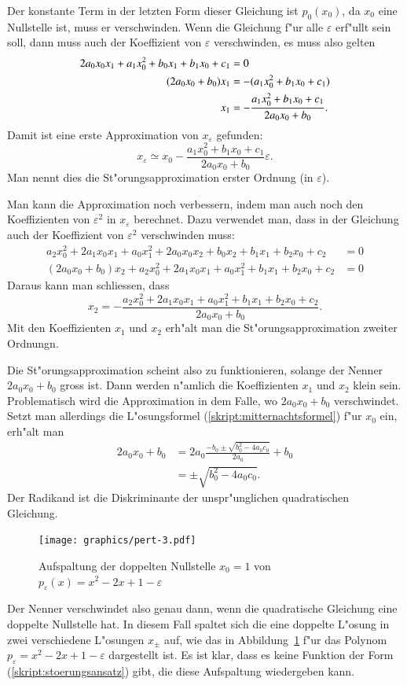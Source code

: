 Der konstante Term in der letzten Form dieser Gleichung ist $p_0(x_0)$, 
da $x_0$ eine Nullstelle ist, muss er verschwinden. Wenn die Gleichung
f"ur alle $\varepsilon$ erf"ullt sein soll, dann muss auch der
Koeffizient von $\varepsilon$ verschwinden, es muss also gelten
\begin{align}
2a_0x_0x_1+a_1x_0^2+b_0x_1+b_1x_0+c_1&= 0
\label{skript:stoerung-1ordnung}
\\
(2a_0x_0+b_0)x_1&=-(a_1x_0^2+b_1x_0+c_1)\\
x_1&=-
\frac{a_1x_0^2+b_1x_0+c_1}{2a_0x_0+b_0}.
\notag
\end{align}
Damit ist eine erste Approximation von $x_\varepsilon$ gefunden:
\[
x_\varepsilon\simeq x_0 -
\frac{a_1x_0^2+b_1x_0+c_1}{2a_0x_0+b_0}\varepsilon.
\]
Man nennt dies die St"orungsapproximation erster Ordnung (in $\varepsilon$).

Man kann die Approximation noch verbessern, indem man auch noch den
Koeffizienten von $\varepsilon^2$ in $x_\varepsilon$ berechnet.
Dazu verwendet man, dass in der Gleichung auch der Koeffizient von
$\varepsilon^2$ verschwinden muss:
\begin{align*}
a_2x_0^2 + 2a_1x_0x_1 + a_0x_1^2 +2a_0x_0x_2
+b_0x_2+b_1x_1+b_2x_0
+c_2
&=0
\\
(2a_0x_0+b_0)x_2
+a_2x_0^2 + 2a_1x_0x_1 + a_0x_1^2
+b_1x_1+b_2x_0
+c_2&=0
\end{align*}
Daraus kann man schliessen, dass
\[
x_2=-\frac{
a_2x_0^2 + 2a_1x_0x_1 + a_0x_1^2
+b_1x_1+b_2x_0
+c_2
}{2a_0x_0+b_0}.
\]
Mit den Koeffizienten $x_1$ und $x_2$ erh"alt man die St"orungsapproximation
zweiter Ordnungn.

Die St"orungsapproximation scheint also zu funktionieren, solange
der Nenner $2a_0x_0+b_0$ gross ist. Dann werden n"amlich die 
Koeffizienten $x_1$ und $x_2$ klein sein. Problematisch wird
die Approximation in dem Falle, wo $2a_0x_0+b_0$ verschwindet.
Setzt man allerdings die L"osungsformel (\ref{skript:mitternachtsformel}) f"ur
$x_0$ ein, erh"alt man
\begin{align*}
2a_0x_0+b_0&=2a_0\frac{-b_0\pm\sqrt{b_0^2-4a_0c_0}}{2a_0}+b_0      \\
           &=\pm\sqrt{b_0^2-4a_0c_0}.
\end{align*}
Der Radikand ist die Diskriminante der unspr"unglichen quadratischen
Gleichung.
\begin{figure}
\centering
\texttt{[image: graphics/pert-3.pdf]}
\caption{Aufspaltung der doppelten Nullstelle $x_0=1$ von
$p_\varepsilon(x)=x^2-2x+1-\varepsilon$
\label{skript:entartetenullstellen}}
\end{figure}
Der Nenner verschwindet also genau dann, wenn die quadratische
Gleichung eine doppelte Nullstelle hat. In diesem Fall spaltet sich
die eine doppelte L"osung in zwei verschiedene L"osungen $x_{\pm}$ auf,
wie das in Abbildung~\ref{skript:entartetenullstellen} f"ur
das Polynom $p_{\varepsilon}=x^2-2x+1-\varepsilon$ dargestellt ist.
Es ist klar, dass es keine Funktion der Form
(\ref{skript:stoerungsansatz}) 
gibt, die diese Aufspaltung wiedergeben kann.


